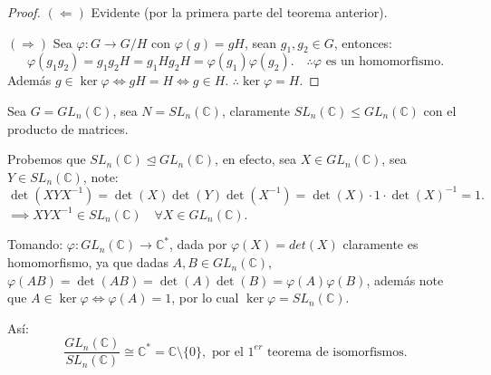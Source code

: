 
\begin{proof}
	$(\Leftarrow)$ Evidente (por la primera parte del teorema anterior).

	$(\Rightarrow)$ Sea $\varphi: G \to G/H$ con $\varphi(g) = gH$, sean $g_1, g_2 \in G$, entonces:
	\begin{equation*}
		\varphi(g_1 g_2) = g_1 g_2 H = g_1 H g_2 H = \varphi(g_1)\varphi(g_2). \quad \therefore \varphi \text{ es un homomorfismo.}
	\end{equation*}
	Además $g \in \ker \varphi \iff gH = H \iff g \in H$. $\therefore \ker \varphi = H$.
\end{proof}

\begin{eje}
	Sea $G = GL_n(\mathbb{C})$, sea $N = SL_n(\mathbb{C})$, claramente $SL_n(\mathbb{C}) \le GL_n(\mathbb{C})$ con el producto de matrices.
\end{eje}

Probemos que $SL_n(\mathbb{C}) \trianglelefteq GL_n(\mathbb{C})$, en efecto, sea $X \in GL_n(\mathbb{C})$, sea $Y \in SL_n(\mathbb{C})$, note:
\begin{equation*}
	\det(XYX^{-1}) = \det(X)\det(Y)\det(X^{-1}) = \det(X) \cdot 1 \cdot \det(X)^{-1} = 1.
\end{equation*}
$\implies XYX^{-1} \in SL_n(\mathbb{C}) \quad \forall X \in GL_n(\mathbb{C})$.

Tomando: $\varphi: GL_n(\mathbb{C}) \to \mathbb{C}^*$, dada por $\varphi(X) = det(X)$ claramente es homomorfismo, ya que dadas $A, B \in GL_n(\mathbb{C})$, $\varphi(AB) = \det(AB) = \det(A)\det(B) = \varphi(A)\varphi(B)$, además note que $A \in \ker \varphi \iff \varphi(A) = 1$, por lo cual $\ker \varphi = SL_n(\mathbb{C})$.

Así:
\begin{equation*}
	\frac{GL_n(\mathbb{C})}{SL_n(\mathbb{C})} \cong \mathbb{C}^* = \mathbb{C} \setminus \{0\}, \text{ por el } 1^{er} \text{ teorema de isomorfismos.}
\end{equation*}


